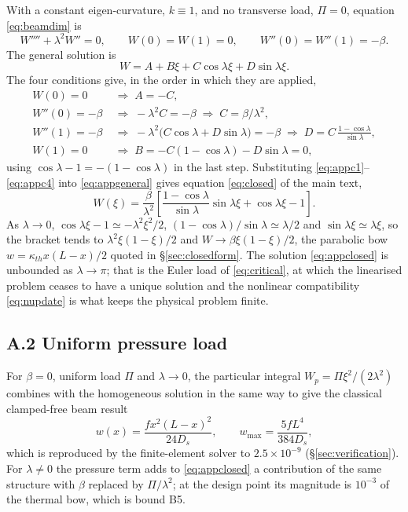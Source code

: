 \documentclass[11pt,a4paper]{article}
\begin{document}
With a constant eigen-curvature, $k\equiv1$, and no transverse load,
$\Pi=0$, equation \eqref{eq:beamdim} is
\begin{equation}
W''''+\lambda^2W''=0,
\qquad W(0)=W(1)=0,\qquad W''(0)=W''(1)=-\beta .
\label{eq:appode}
\end{equation}
The general solution is
\begin{equation}
W=A+B\xi+C\cos\lambda\xi+D\sin\lambda\xi .
\label{eq:appgeneral}
\end{equation}
The four conditions give, in the order in which they are applied,
\begin{align}
W(0)=0 &\;\Longrightarrow\; A=-C, \label{eq:appc1}\\
W''(0)=-\beta &\;\Longrightarrow\; -\lambda^2C=-\beta
\;\Longrightarrow\; C=\beta/\lambda^2, \label{eq:appc2}\\
W''(1)=-\beta &\;\Longrightarrow\; -\lambda^2\bigl(C\cos\lambda+D\sin\lambda\bigr)
=-\beta \;\Longrightarrow\; D=C\,\frac{1-\cos\lambda}{\sin\lambda},
\label{eq:appc3}\\
W(1)=0 &\;\Longrightarrow\; B=-C(1-\cos\lambda)-D\sin\lambda=0 ,
\label{eq:appc4}
\end{align}
using $\cos\lambda-1=-(1-\cos\lambda)$ in the last step. Substituting
\eqref{eq:appc1}--\eqref{eq:appc4} into \eqref{eq:appgeneral} gives
equation \eqref{eq:closed} of the main text,
\begin{equation}
W(\xi)=\frac{\beta}{\lambda^2}\left[
\frac{1-\cos\lambda}{\sin\lambda}\sin\lambda\xi+\cos\lambda\xi-1\right].
\label{eq:appclosed}
\end{equation}
As $\lambda\to0$, $\cos\lambda\xi-1\simeq-\lambda^2\xi^2/2$,
$(1-\cos\lambda)/\sin\lambda\simeq\lambda/2$ and $\sin\lambda\xi\simeq
\lambda\xi$, so the bracket tends to $\lambda^2\xi(1-\xi)/2$ and
$W\to\beta\xi(1-\xi)/2$, the parabolic bow $w=\kappa_{th}x(L-x)/2$ quoted in
\S\ref{sec:closedform}. The solution \eqref{eq:appclosed} is unbounded as
$\lambda\to\pi$; that is the Euler load of \eqref{eq:critical}, at which the
linearised problem ceases to have a unique solution and the nonlinear
compatibility \eqref{eq:nupdate} is what keeps the physical problem finite.

\subsection*{A.2 Uniform pressure load}

For $\beta=0$, uniform load $\Pi$ and $\lambda\to0$, the particular integral
$W_p=\Pi\xi^2/(2\lambda^2)$ combines with the homogeneous solution in the same
way to give the classical clamped-free beam result
\begin{equation}
w(x)=\frac{f x^2(L-x)^2}{24D_s},
\qquad
w_{\max}=\frac{5fL^4}{384D_s},
\label{eq:apppressure}
\end{equation}
which is reproduced by the finite-element solver to
$2.5\times10^{-9}$ (\S\ref{sec:verification}). For $\lambda\neq0$ the
pressure term adds to \eqref{eq:appclosed} a contribution of the same
structure with $\beta$ replaced by $\Pi/\lambda^2$; at the design point its
magnitude is $10^{-3}$ of the thermal bow, which is bound B5.
\end{document}
